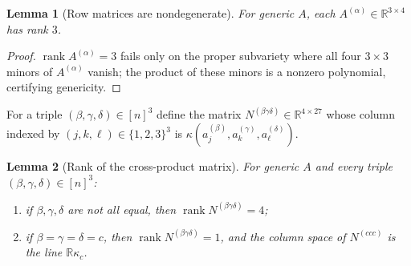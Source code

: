 \documentclass[12pt]{article}
\DeclareMathOperator{\rank}{rank}
\newcommand{\bR}{\mathbb{R}}
\newtheorem{lemma}{Lemma}
\theoremstyle{definition}
\begin{document}
\begin{lemma}[Row matrices are nondegenerate]\label{lem:Arank}
For generic $A$, each $A^{(\alpha)}\in\bR^{3\times4}$ has rank $3$.
\end{lemma}

\begin{proof}
$\rank A^{(\alpha)}=3$ fails only on the proper subvariety where all four
$3\times3$ minors of $A^{(\alpha)}$ vanish; the product of these minors is a
nonzero polynomial, certifying genericity.
\end{proof}

For a triple $(\beta,\gamma,\delta)\in[n]^3$ define the matrix
$N^{(\beta\gamma\delta)}\in\bR^{4\times27}$ whose column indexed by
$(j,k,\ell)\in\{1,2,3\}^3$ is $\kappa(a^{(\beta)}_j,a^{(\gamma)}_k,a^{(\delta)}_\ell)$.

\begin{lemma}[Rank of the cross-product matrix]\label{lem:Nrank}
For generic $A$ and every triple $(\beta,\gamma,\delta)\in[n]^3$:
\begin{enumerate}[label=\textup{(\roman*)}]
\item if $\beta,\gamma,\delta$ are not all equal, then $\rank N^{(\beta\gamma\delta)}=4$;
\item if $\beta=\gamma=\delta=c$, then $\rank N^{(\beta\gamma\delta)}=1$, and the
column space of $N^{(ccc)}$ is the line $\bR\kappa_c$.
\end{enumerate}
\end{lemma}
\end{document}
